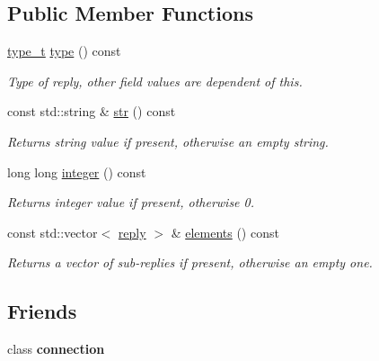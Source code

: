 \subsection*{Public Member Functions}
\begin{DoxyCompactItemize}
\item 
\hyperlink{classredis3m_1_1reply_ac44942a4ec175e767ce119d452ffafd6}{type\-\_\-t} \hyperlink{classredis3m_1_1reply_a432022d4727f30c938ae30d6a3ed19e3}{type} () const 
\begin{DoxyCompactList}\small\item\em Type of reply, other field values are dependent of this. \end{DoxyCompactList}\item 
const std\-::string \& \hyperlink{classredis3m_1_1reply_a307e33a668bcfa162630de7b2cb0d0a1}{str} () const 
\begin{DoxyCompactList}\small\item\em Returns string value if present, otherwise an empty string. \end{DoxyCompactList}\item 
long long \hyperlink{classredis3m_1_1reply_a44eab40d41874248d97f68f7df142c82}{integer} () const 
\begin{DoxyCompactList}\small\item\em Returns integer value if present, otherwise 0. \end{DoxyCompactList}\item 
const std\-::vector$<$ \hyperlink{classredis3m_1_1reply}{reply} $>$ \& \hyperlink{classredis3m_1_1reply_abc01cc8d11878c895bdee9710fe1888d}{elements} () const 
\begin{DoxyCompactList}\small\item\em Returns a vector of sub-\/replies if present, otherwise an empty one. \end{DoxyCompactList}\end{DoxyCompactItemize}
\subsection*{Friends}
\begin{DoxyCompactItemize}
\item 
\hypertarget{classredis3m_1_1reply_adb115488bb4890f7fc705ee527ad71e0}{class {\bfseries connection}}\label{classredis3m_1_1reply_adb115488bb4890f7fc705ee527ad71e0}

\end{DoxyCompactItemize}


